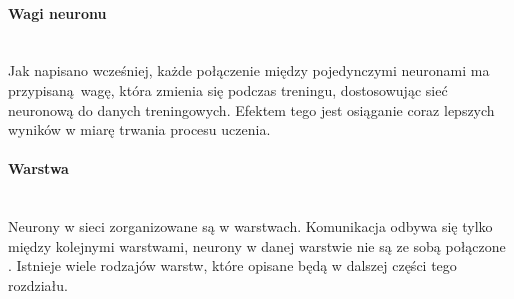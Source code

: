 \paragraph{Wagi neuronu} \mbox{}\\
Jak napisano wcześniej, każde połączenie między pojedynczymi neuronami ma przypisaną wagę,
która zmienia się podczas treningu, dostosowując sieć neuronową do danych treningowych.
Efektem tego jest osiąganie coraz lepszych wyników w miarę trwania procesu uczenia.

\paragraph{Warstwa} \mbox{}\\
Neurony w sieci zorganizowane są w warstwach. Komunikacja odbywa się tylko między kolejnymi
warstwami, neurony w danej warstwie nie są ze sobą połączone \cite{CS231n, substBigConv}.
Istnieje wiele rodzajów warstw, które opisane będą w dalszej części tego rozdziału.

